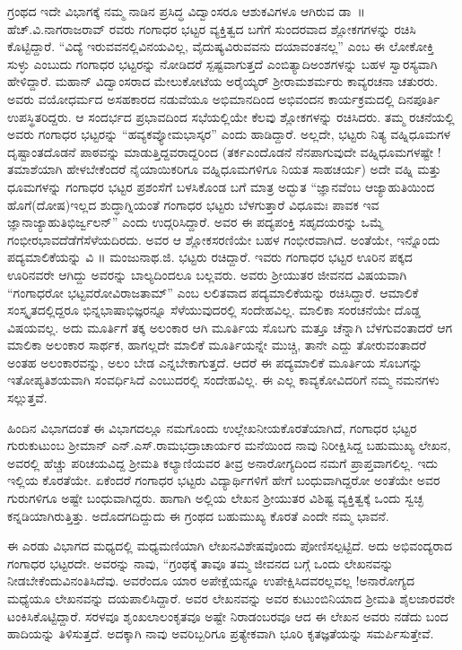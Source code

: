{ಗ್ರಂಥದ ಇದೇ ವಿಭಾಗಕ್ಕೆ ನಮ್ಮ ನಾಡಿನ ಪ್ರಸಿದ್ಧ ವಿದ್ವಾಂಸರೂ ಆಶುಕವಿಗಳೂ ಆಗಿರುವ ಡಾ~॥ ಹೆಚ್.ವಿ.ನಾಗರಾಜರಾವ್ ರವರು ಗಂಗಾಧರ ಭಟ್ಟರ ವ್ಯಕ್ತಿತ್ವದ ಬಗೆಗೆ ಸುಂದರವಾದ ಶ್ಲೋಕಗಗಳನ್ನು ರಚಿಸಿ ಕೊಟ್ಟಿದ್ದಾರೆ. “ವಿದ್ಯೆ ಇರುವವನಲ್ಲಿ\break ವಿನಯವಿಲ್ಲ, ವೈದುಷ್ಯವಿರುವವನು ದಯಾವಂತನಲ್ಲ” ಎಂಬ ಈ ಲೋಕೋಕ್ತಿ ಸುಳ್ಳು ಎಂಬುದು ಗಂಗಾಧರ ಭಟ್ಟರನ್ನು ನೋಡಿದರೆ ಸ್ಪಷ್ಟವಾಗುತ್ತದೆ ಎಂಬಿತ್ಯಾದಿ\break ಅಂಶಗಳನ್ನು ಬಹಳ ಸ್ವಾರಸ್ಯವಾಗಿ ಹೇಳಿದ್ದಾರೆ. ಮಹಾನ್ ವಿದ್ವಾಂಸರಾದ ಮೇಲು\-ಕೋಟೆಯ ಅರೈಯ್ಯರ್ ಶ್ರೀರಾಮಶರ್ಮರು ಕಾವ್ಯರಚನಾ ಚತುರರು. ಅವರು ವಯೋಧರ್ಮದ ಅಸಹಕಾರದ ನಡುವೆಯೂ ಅಭಿಮಾನದಿಂದ ಅಭಿವಂದನ ಕಾರ್ಯ\-ಕ್ರಮದಲ್ಲಿ ದಿನಪೂರ್ತಿ ಉಪಸ್ಥಿತರಿದ್ದರು. ಆ ಸಂದರ್ಭದ ಪ್ರಭಾವದಿಂದ ಸಭೆಯಲ್ಲಿಯೇ ಕೆಲವು ಶ್ಲೋಕಗಳನ್ನು ರಚಿಸಿದರು. ತಮ್ಮ ರಚನೆಯಲ್ಲಿ ಅವರು ಗಂಗಾಧರ ಭಟ್ಟರನ್ನು \enginline{-}“ಹವ್ಯಕವ್ಯೋಮ\enginline{-}ಭಾಸ್ಕರ” ಎಂದು ಹಾಡಿದ್ದಾರೆ. ಅಲ್ಲದೇ, ಭಟ್ಟರು ನಿತ್ಯ ವಹ್ನಿಧೂಮಗಳ ದೃಷ್ಟಾಂತದೊಡನೆ ಪಾಠವನ್ನು ಮಾಡುತ್ತಿದ್ದವರಾದ್ದರಿಂದ (ತರ್ಕ\break ಎಂದೊಡನೆ ನೆನಪಾಗುವುದೇ ವಹ್ನಿಧೂಮಗಳಷ್ಟೇ ! ತಮಾಶೆಯಾಗಿ ಹೇಳಬೇಕೆಂದರೆ ನೈಯಾಯಿಕರಿಗೂ ವಹ್ನಿಧೂಮಗಳಿಗೂ ನಿಯತ ಸಾಹಚರ್ಯ) ಅದೇ ವಹ್ನಿ ಮತ್ತು ಧೂಮಗಳನ್ನು  ಗಂಗಾಧರ ಭಟ್ಟರ ಪ್ರಶಂಸೆಗೆ ಬಳಸಿಕೊಂಡ ಬಗೆ ಮಾತ್ರ ಅದ್ಭುತ \enginline{-} “ಜ್ಞಾನವೆಂಬ ಆಜ್ಯಾಹುತಿಯಿಂದ ಹೊಗೆ(ದೋಷ)ಇಲ್ಲದ ಶುದ್ಧಾಗ್ನಿಯಂತೆ ಗಂಗಾಧರ ಭಟ್ಟರು ಬೆಳಗುತ್ತಾರೆ \enginline{-} ವಿಧೂಮಃ ಪಾವಕ ಇವ ಜ್ಞಾನಾಜ್ಯಾಹುತಿಭಿರ್ಜ್ವಲನ್” ಎಂದು ಉದ್ಗರಿಸಿದ್ದಾರೆ. ಅವರ ಈ ಪದ್ಯಪಂಕ್ತಿ ಸಹೃದಯರನ್ನು ಒಮ್ಮೆ ಗಂಭೀರಭಾವದೆಡೆಗೆ\break ಸೆಳೆಯದಿರದು. ಅವರ ಆ ಶ್ಲೋಕಸರಣಿಯೇ ಬಹಳ ಗಂಭೀರವಾಗಿದೆ. ಅಂತೆಯೇ, ಇನ್ನೊಂದು ಪದ್ಯಮಾಲಿಕೆಯನ್ನು ವಿ ॥ ಮಂಜುನಾಥ.ಜಿ. ಭಟ್ಟರು ರಚಿದ್ದಾರೆ. ಇವರು ಗಂಗಾಧರ ಭಟ್ಟರ ಊರಿನ ಪಕ್ಕದ ಊರಿನವರೇ ಆಗಿದ್ದು ಅವರನ್ನು ಬಾಲ್ಯದಿಂದಲೂ ಬಲ್ಲವರು. ಅವರು ಶ್ರೀಯುತರ ಜೀವನದ ವಿಷಯವಾಗಿ “ಗಂಗಾಧರೋ  ಭಟ್ಟವರೋ\break ವಿರಾಜತಾಮ್” ಎಂಬ ಲಲಿತವಾದ ಪದ್ಯಮಾಲಿಕೆಯನ್ನು  ರಚಿಸಿದ್ದಾರೆ. ಆ\break ಮಾಲಿಕೆ ಸಂಸ್ಕೃತದಲ್ಲಿದ್ದರೂ ಭಿನ್ನಭಾಷಾಭಿಜ್ಞರನ್ನೂ ಸೆಳೆಯುವುದರಲ್ಲಿ ಸಂದೇಹವಿಲ್ಲ. ಮಾಲಿಕಾ ಸಂರಚನೆಯೇ ದೊಡ್ಡ ವಿಷಯವಲ್ಲ. ಅದು ಮೂರ್ತಿಗೆ ತಕ್ಕ ಅಲಂಕಾರ ಆಗಿ ಮೂರ್ತಿಯ ಸೊಬಗು ಮತ್ತೂ ಚೆನ್ನಾಗಿ ಬೆಳಗುವಂತಾದರೆ ಆಗ ಮಾಲಿಕಾ ಅಲಂಕಾರ ಸಾರ್ಥಕ, ಹಾಗಲ್ಲದೇ ಮಾಲಿಕೆ ಮೂರ್ತಿಯನ್ನೇ ಮುಚ್ಚಿ, ತಾನೇ ಎದ್ದು ತೋರುವಂತಾದರೆ ಅಂತಹ ಅಲಂಕಾರವನ್ನು, ಅಲಂ \enginline{-} ಬೇಡ ಎನ್ನಬೇಕಾಗುತ್ತದೆ. ಆದರೆ ಈ \hbox{ಪದ್ಯಮಾಲಿಕೆ} ಮೂರ್ತಿಯ ಸೊಬಗನ್ನು ಇತೋಪ್ಯತಿಶಯವಾಗಿ ಸಂವರ್ಧಿಸಿದೆ ಎಂಬುದರಲ್ಲಿ ಸಂದೇಹವಿಲ್ಲ. ಈ ಎಲ್ಲ ಕಾವ್ಯಕೋವಿದರಿಗೆ ನಮ್ಮ ನಮನಗಳು \hbox{ಸಲ್ಲುತ್ತವೆ.}

 
ಹಿಂದಿನ ವಿಭಾಗದಂತೆ ಈ ವಿಭಾಗದಲ್ಲೂ ನಮಗೊಂದು ಉಲ್ಲೇಖನೀಯ\break ಕೊರತೆಯಾಗಿದೆ, ಗಂಗಾಧರ ಭಟ್ಟರ ಗುರುಕುಟುಂಬ \enginline{-} ಶ್ರೀಮಾನ್ ಎನ್.ಎಸ್.ರಾಮ\-ಭದ್ರಾಚಾರ್ಯರ ಮನೆಯಿಂದ ನಾವು ನಿರೀಕ್ಷಿಸಿದ್ದ ಬಹುಮುಖ್ಯ ಲೇಖನ, ಅವರಲ್ಲಿ ಹೆಚ್ಚು ಪರಿಚಯವಿದ್ದ ಶ್ರೀಮತಿ ಕಲ್ಯಾಣಿಯವರ ತೀವ್ರ ಅನಾರೋಗ್ಯದಿಂದ ನಮಗೆ ಪ್ರಾಪ್ತವಾಗಲಿಲ್ಲ. ಇದು ಇಲ್ಲಿಯ ಕೊರತೆಯೇ. ಏಕೆಂದರೆ ಗಂಗಾಧರ ಭಟ್ಟರು ವಿದ್ಯಾರ್ಥಿಗಳಿಗೆ ಹೇಗೆ ಬಂಧುವಾಗಿದ್ದರೋ ಅಂತೆಯೇ ಅವರ ಗುರುಗಳಿಗೂ ಅಷ್ಟೇ ಬಂಧುವಾಗಿದ್ದರು. ಹಾಗಾಗಿ ಅಲ್ಲಿಯ ಲೇಖನ ಶ್ರೀಯುತರ ವಿಶಿಷ್ಟ ವ್ಯಕ್ತಿತ್ವಕ್ಕೆ ಒಂದು ಸ್ವಚ್ಛ ಕನ್ನಡಿಯಾಗಿರುತ್ತಿತ್ತು. ಅದೊದಗದಿದ್ದುದು ಈ ಗ್ರಂಥದ ಬಹುಮುಖ್ಯ ಕೊರತೆ ಎಂದೇ ನಮ್ಮ ಭಾವನೆ.

ಈ ಎರಡು ವಿಭಾಗದ ಮಧ್ಯದಲ್ಲಿ ಮಧ್ಯಮಣಿಯಾಗಿ ಲೇಖನವಿಶೇಷವೊಂದು ಪೋಣಿಸಲ್ಪಟ್ಟಿದೆ. ಅದು ಅಭಿವಂದ್ಯರಾದ ಗಂಗಾಧರ ಭಟ್ಟರದೇ. ಅವರನ್ನು ನಾವು, “ಗ್ರಂಥಕ್ಕೆ ತಾವೂ ತಮ್ಮ ಜೀವನದ ಬಗ್ಗೆ ಒಂದು ಲೇಖನವನ್ನು ನೀಡಬೇಕೆಂದು\break ವಿನಂತಿಸಿದೆವು. ಅವರೆಂದೂ ಯಾರ ಅಪೇಕ್ಷೆಯನ್ನೂ ಉಪೇಕ್ಷಿಸಿದವರಲ್ಲವಲ್ಲ !\break ಅನಾರೋಗ್ಯದ ಮಧ್ಯೆಯೂ ಲೇಖನವನ್ನು ದಯಪಾಲಿಸಿದ್ದಾರೆ. ಅವರ ಲೇಖನವನ್ನು ಅವರ ಕುಟುಂಬಿನಿಯಾದ \enginline{-} ಶ್ರೀಮತಿ ಶೈಲಜಾರವರೇ ಟಂಕಿಸಿಕೊಟ್ಟಿದ್ದಾರೆ. ಸರಳವೂ ಶೃಂಖಲಾಲಂಕೃತವೂ ಅಷ್ಟೇ ನಿರಾಡಂಬರವೂ ಆದ ಈ ಲೇಖನ ಅವರು ನಡೆದು ಬಂದ ಹಾದಿಯನ್ನು ತಿಳಿಸುತ್ತದೆ. ಅದಕ್ಕಾಗಿ ನಾವು ಅವರಿಬ್ಬರಿಗೂ ಪ್ರತ್ಯೇಕವಾಗಿ ಭೂರಿ ಕೃತಜ್ಞತೆಯನ್ನು ಸಮರ್ಪಿಸುತ್ತೇವೆ.


}
